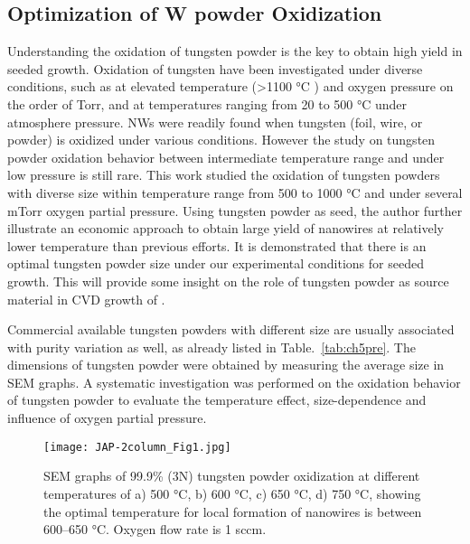 \subsection{Optimization of W powder Oxidization}\label{sec:woxd}

Understanding the oxidation of tungsten powder is the key to obtain high yield in seeded growth. Oxidation of tungsten have been investigated under diverse conditions, such as at elevated temperature (\textgreater 1100 \si{\degreeCelsius} ) and oxygen pressure on the order of Torr,\cite{Base1965} and at temperatures ranging from 20 to 500 \si{\degreeCelsius} under atmosphere pressure.\cite{Warren1996}  NWs were readily found when tungsten (foil, wire, or powder) is oxidized under various conditions.\cite{Zhu1999,Karuppanan2007,Hsieh2010} However the study on tungsten powder oxidation behavior between intermediate temperature range and under low pressure is still rare. This work studied the oxidation of tungsten powders with diverse size within temperature range from 500 to 1000 \si{\degreeCelsius} and under several mTorr oxygen partial pressure. Using tungsten powder as seed, the author further illustrate an economic approach to obtain large yield of  nanowires at relatively lower temperature than previous efforts. It is demonstrated that there is an optimal tungsten powder size under our experimental conditions for seeded growth. This will provide some insight on the role of tungsten powder as source material in CVD growth of .

Commercial available tungsten powders with different size are usually associated with purity variation as well, as already listed in Table.~\ref{tab:ch5pre}. The dimensions of tungsten powder were obtained by measuring the average size in SEM graphs. A systematic investigation was performed on the oxidation behavior of tungsten powder to evaluate the temperature effect, size-dependence and influence of oxygen partial pressure.
\begin{figure}[htb]
\centering
\texttt{[image: JAP-2column\_Fig1.jpg]}
\caption[W powder oxidation: temperature effect]{SEM graphs of 99.9\% (3N) tungsten powder oxidization at different temperatures of a) 500 \si{\degreeCelsius}, b) 600 \si{\degreeCelsius}, c) 650 \si{\degreeCelsius}, d) 750 \si{\degreeCelsius}, showing the optimal temperature for local formation of nanowires is between 600--650 \si{\degreeCelsius}. Oxygen flow rate is 1 sccm.}
\label{fig:pdtemp}
\end{figure}

